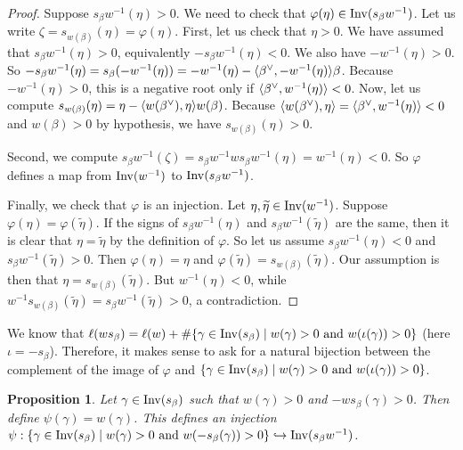 \documentclass[10pt]{amsart}
\newtheorem{prop}[theo]{Proposition}
\begin{document}
\begin{proof}
Suppose $s_\beta w^{-1}(\eta)>0$. We need to check that $\varphi(\eta) \in \operatorname{Inv}(s_\beta w^{-1})$. Let us write $\zeta = s_{w(\beta)}(\eta) = \varphi(\eta)$. First, let us check that $\eta > 0$. We have assumed that $s_\beta w^{-1}(\eta) > 0$, equivalently $-s_\beta w^{-1}(\eta) < 0$. We also have $-w^{-1}(\eta) > 0$. So $-s_\beta w^{-1}(\eta) = s_\beta(- w^{-1}(\eta)) = - w^{-1}(\eta) - \langle \beta^\vee, - w^{-1}(\eta) \rangle \beta $. Because $-w^{-1}(\eta) > 0$, this is a negative root only if $\langle \beta^\vee, w^{-1}(\eta) \rangle < 0$. Now, let us compute $s_{w(\beta)}(\eta) = \eta - \langle w(\beta^\vee), \eta \rangle w(\beta)$. Because $\langle w(\beta^\vee), \eta \rangle = \langle \beta^\vee, w^{-1}(\eta) \rangle < 0$ and $w(\beta)>0$ by hypothesis, we have $s_{w(\beta)}(\eta) > 0$.

Second, we compute $s_\beta w^{-1}(\zeta) = s_\beta w^{-1} w s_\beta w^{-1} (\eta) = w^{-1} (\eta) < 0$. So $\varphi$ defines a map from $\operatorname{Inv}(w^{-1})$ to $\operatorname{Inv}(s_\beta w^{-1})$.

Finally, we check that $\varphi$ is an injection. Let $\eta, \widetilde{\eta} \in \operatorname{Inv}(w^{-1})$. Suppose $\varphi(\eta) = \varphi(\widetilde{\eta})$. If the signs of $s_\beta w^{-1}(\eta)$ and $s_\beta w^{-1}(\widetilde{\eta})$ are the same, then it is clear that $\eta = \widetilde{\eta}$ by the definition of $\varphi$. So let us assume $s_\beta w^{-1}(\eta) < 0$ and $s_\beta w^{-1}(\widetilde{\eta}) > 0$. Then $\varphi(\eta) = \eta$ and $\varphi(\widetilde{\eta}) = s_{w(\beta)}(\widetilde{\eta})$. Our assumption is then that $\eta = s_{w(\beta)}(\widetilde{\eta})$. But $w^{-1}(\eta) < 0$, while $w^{-1}s_{w(\beta)}(\widetilde{\eta}) = s_{\beta}w^{-1}(\widetilde{\eta}) > 0$, a contradiction.
\end{proof}

We know that $\ell(ws_\beta) = \ell(w) + \# \{ \gamma \in \operatorname{Inv}(s_\beta) \mid w(\gamma) > 0 \text{ and } w(\iota(\gamma)) > 0 \}$ (here $\iota = - s_\beta$). Therefore, it makes sense to ask for a natural bijection between the complement of the image of $\varphi$ and $\{ \gamma \in \operatorname{Inv}(s_\beta) \mid w(\gamma) > 0 \text{ and } w(\iota(\gamma)) > 0 \}$.

\begin{prop}\label{prop-psi-is-an-injection}
Let $\gamma \in \operatorname{Inv}(s_\beta)$ such that $w(\gamma) > 0$ and $- w s_\beta (\gamma) > 0$. Then define $\psi(\gamma) = w(\gamma)$. This defines an injection $\psi :\{ \gamma \in \operatorname{Inv}(s_\beta) \mid w(\gamma) > 0 \text{ and } w(-s_\beta(\gamma)) > 0 \} \hookrightarrow \operatorname{Inv}(s_\beta w^{-1})$.
\end{prop}
\end{document}
